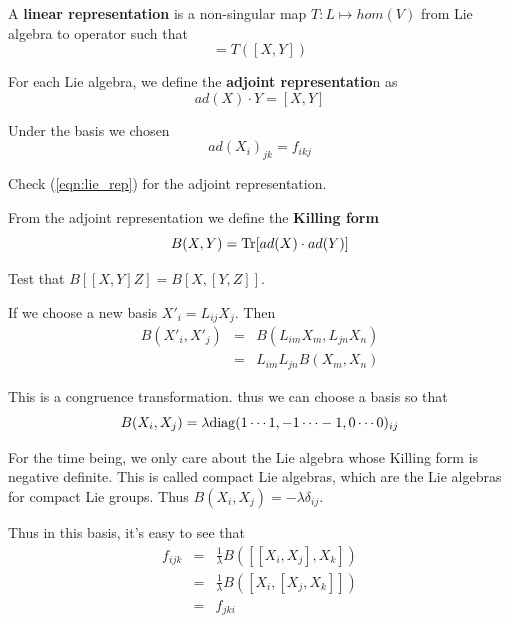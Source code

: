 \documentclass[12pt]{book}
\begin{document}
	\begin{definition}
		A {\bf linear representation} is a non-singular map $T:L\mapsto hom(V)$ from Lie algebra to operator such that
		\begin{equation}
			[T(X),T(Y)]=T([X,Y]) \label{eqn:lie_rep}
		\end{equation}
	\end{definition}
	
	
	For each Lie algebra, we define the \textbf{adjoint representatio}n as
	\begin{equation}
		ad(X)\cdot Y=[X,Y]
	\end{equation}
	
	Under the basis we chosen
	\begin{equation}
		ad(X_i)_{jk}=f_{ikj}
	\end{equation}
	\begin{myExercise}
		Check (\ref{eqn:lie_rep}) for the adjoint representation.
	\end{myExercise}
	
	From the adjoint representation we define the \textbf{Killing form}
	\begin{equation}
		B(X,Y)={\rm Tr}[ad(X)\cdot ad(Y)]
	\end{equation}
	\begin{myExercise}
		Test that $B[[X,Y]Z]=B[X,[Y,Z]]$.
	\end{myExercise}
	
	If we choose a new basis $X'_i=L_{ij}X_j$. Then
	\begin{eqnarray}
		B(X'_i,X'_j)&=&B(L_{im}X_m,L_{jn}X_n)\\
		&=&L_{im}L_{jn}B(X_m,X_n)
	\end{eqnarray}
	
	This is a congruence transformation. thus we can choose a basis so that
	\begin{equation} 
		B(X_i,X_j)=\lambda{\rm diag}(1\cdots 1,-1\cdots -1,0\cdots 0)_{ij}
	\end{equation}
	
	For the time being, we only care about the Lie algebra whose Killing form is negative definite. This is called compact Lie algebras, which are the Lie algebras for compact Lie groups. Thus $B(X_i,X_j)=-\lambda\delta_{ij}$.
	
	Thus in this basis, it's easy to see that
	\begin{eqnarray}
		f_{ijk}&=&\frac 1\lambda B([[X_i,X_j],X_k])\\
		&=&\frac 1\lambda B([X_i,[X_j,X_k]])\\
		&=&f_{jki}
	\end{eqnarray}
	
\end{document}
